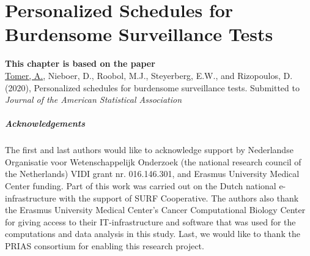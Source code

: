 \chapter[Personalized Schedules for Burdensome Surveillance Tests][Personalized Schedules for Burdensome Surveillance Tests]{Personalized Schedules for Burdensome Surveillance Tests}
\label{c4}

\vspace*{\fill}
\textbf{This chapter is based on the paper}\\
\underline{Tomer, A.}, Nieboer, D., Roobol, M.J., Steyerberg, E.W., and Rizopoulos, D. (2020), Personalized schedules for burdensome surveillance tests. Submitted to \emph{Journal of the American Statistical Association}

\clearpage

\clearpage







\paragraph{Acknowledgements}
The first and last authors would like to acknowledge support by Nederlandse Organisatie voor Wetenschappelijk Onderzoek (the national research council of the Netherlands) VIDI grant nr. 016.146.301, and Erasmus University Medical Center funding. Part of this work was carried out on the Dutch national e-infrastructure with the support of SURF Cooperative. The authors also thank the Erasmus University Medical Center's Cancer Computational Biology Center for giving access to their IT-infrastructure and software that was used for the computations and data analysis in this study. Last, we would like to thank the PRIAS consortium for enabling this research project.



\clearpage

